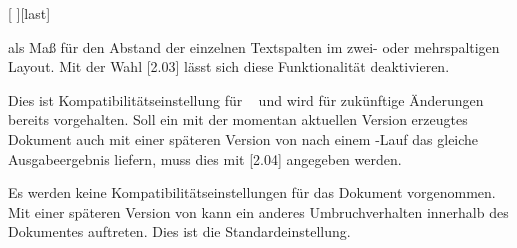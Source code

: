 \begin{Declaration}[v2.03]{[%
  \textOR{}\textOR{}%
]}[last]
\begin{values}
  als Maß für den Abstand der einzelnen Textspalten im zwei- oder mehrspaltigen 
  Layout. Mit der Wahl [2.03] lässt sich diese Funktionalität 
  deaktivieren.
\item[\PValue{2.04}]
  Dies ist Kompatibilitätseinstellung für \TUDScript~\vTUDScript{} und wird für 
  zukünftige Änderungen bereits vorgehalten. Soll ein mit der momentan 
  aktuellen Version erzeugtes Dokument auch mit einer späteren Version von 
  \TUDScript nach einem -Lauf das gleiche Ausgabeergebnis 
  liefern, muss dies mit [2.04] angegeben werden.
\item[\PValue{last}]
  Es werden keine Kompatibilitätseinstellungen für das Dokument vorgenommen. 
  Mit einer späteren Version von \TUDScript kann ein anderes Umbruchverhalten 
  innerhalb des Dokumentes auftreten. Dies ist die Standardeinstellung.
\end{values}
\end{Declaration}

